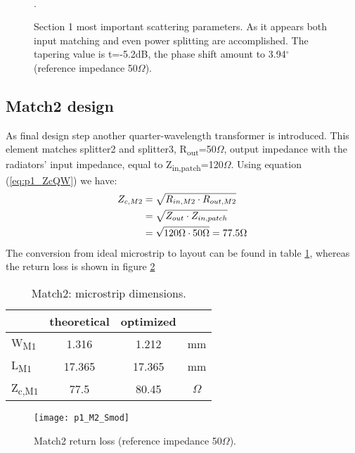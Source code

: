 \begin{figure}[H] 
	\centering
	\quad
	\\
	\caption{Section 1 most important scattering parameters. As it appears both input matching and even power splitting are accomplished. The tapering value is t=-5.2dB, the phase shift amount to 3.94$^\circ$ (reference impedance 50$\Omega$).}.
	\label{fig:p2_sec1Scatt}
\end{figure}

\subsection{Match2 design}

As final design step another quarter-wavelength transformer is introduced. This element matches splitter2 and splitter3, R\textsubscript{out}=50$\Omega$, output impedance with the radiators' input impedance, equal to Z\textsubscript{in,patch}=120$\Omega$. Using equation (\ref{eq:p1_ZcQW}) we have:
\begin{align}
	Z_{c,M2}&=\sqrt{R_{in,M2}\cdot R_{out,M2}} \notag\\
	&=\sqrt{Z_{out}\cdot Z_{in,patch}} \notag\\
	&=\sqrt{120\Omega \cdot 50\Omega}=77.5\Omega \notag
\end{align}
The conversion from ideal microstrip to layout can be found in table \ref{tab:21_DimM2}, whereas the return loss is shown in figure \ref{fig:p1_M2_Smod}

\begin{table} [H]
	\label{tab:21_DimM2}
	\caption{Match2: microstrip dimensions.}
	\centering	
	\begin{tabular}{lccc} 
		\toprule
		& theoretical 			& optimized &\\
		\midrule 
		W\textsubscript{M1} 	&	1.316		&	1.212	& mm 		\\
		L\textsubscript{M1}		&	17.365		& 	17.365	& mm		\\ 
		Z\textsubscript{c,M1}	&	77.5		& 	80.45	& $\Omega$		\\
		\bottomrule
	\end{tabular}	
\end{table}

\begin{figure}[t] 
	\centering
	\texttt{[image: p1\_M2\_Smod]}
	\caption{Match2 return loss (reference impedance 50$\Omega$). }
	\label{fig:p1_M2_Smod}
\end{figure}